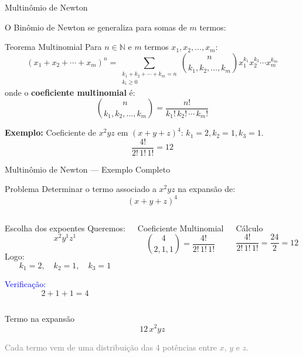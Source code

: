 \documentclass[9pt]{beamer}
\begin{document}
\begin{frame}{Multinômio de Newton}

O Binômio de Newton se generaliza para somas de $m$ termos:

\begin{block}{Teorema Multinomial}
Para $n \in \mathbb{N}$ e $m$ termos $x_1, x_2, \dots, x_m$:
\[
(x_1 + x_2 + \cdots + x_m)^n = \sum_{\substack{k_1+k_2+\cdots+k_m = n \\ k_i \geq 0}} \binom{n}{k_1, k_2, \ldots, k_m} x_1^{k_1} x_2^{k_2} \cdots x_m^{k_m}
\]
onde o \textbf{coeficiente multinomial} é:
\[
\binom{n}{k_1, k_2, \ldots, k_m} = \frac{n!}{k_1!\, k_2!\, \cdots\, k_m!}
\]
\end{block}

\vspace{0.2cm}

\textbf{Exemplo:} Coeficiente de $x^2 y z$ em $(x+y+z)^4$: $k_1=2, k_2=1, k_3=1$.
\[
\frac{4!}{2!\,1!\,1!} = 12
\]
\end{frame}
\begin{frame}{Multinômio de Newton — Exemplo Completo}

\begin{block}{Problema}
Determinar o termo associado a $x^2 y z$ na expansão de:
\[
(x + y + z)^4
\]
\end{block}

\vspace{0.3cm}

\begin{columns}


\begin{block}{Escolha dos expoentes}
Queremos:
\[
x^2 y^1 z^1
\]

Logo:
\[
k_1 = 2,\quad k_2 = 1,\quad k_3 = 1
\]

\vspace{0.2cm}

\textcolor{blue}{Verificação:}
\[
2 + 1 + 1 = 4
\]
\end{block}


\begin{block}{Coeficiente Multinomial}
\[
\binom{4}{2,1,1} =
\frac{4!}{2!\,1!\,1!}
\]
\end{block}


\begin{alertblock}{Cálculo}
\[
\frac{4!}{2!\,1!\,1!} =
\frac{24}{2} = 12
\]
\end{alertblock}

\end{columns}


\begin{block}{Termo na expansão}
\[
\boxed{12\,x^2 y z}
\]
\end{block}


\textcolor{gray}{Cada termo vem de uma distribuição das 4 potências entre $x$, $y$ e $z$.}

\end{frame}
\end{document}
